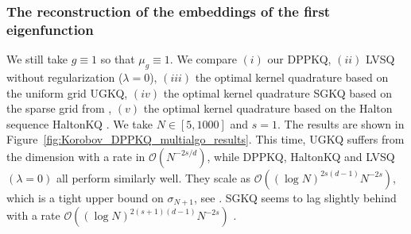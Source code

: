 \documentclass[twoside,11pt]{book}
\numberwithin{theorem}{chapter}
\numberwithin{definition}{chapter}
\numberwithin{proposition}{chapter}
\numberwithin{corollary}{chapter}
\numberwithin{example}{chapter}
\numberwithin{lemma}{chapter}
\numberwithin{assumption}{chapter}
\begin{document}
\subsubsection{The reconstruction of the embeddings of the first eigenfunction}
We still take $g\equiv 1$ so that $\mu_{g} \equiv 1$. We compare $(i)$ our DPPKQ, $(ii)$ LVSQ without regularization ($\lambda =0$), $(iii)$ the optimal kernel quadrature based on the uniform grid UGKQ, $(iv)$ the optimal kernel quadrature SGKQ based on the sparse grid from \citep{Smo63}, $(v)$ the optimal kernel quadrature based on the Halton sequence HaltonKQ \citep{Hal64}. We take $N \in [5,1000]$ and $s =1$. The results are shown in Figure~\ref{fig:Korobov_DPPKQ_multialgo_results}. This time, UGKQ suffers from the dimension with a rate in $\mathcal{O}(N^{-2s/d})$, while DPPKQ, HaltonKQ and LVSQ $(\lambda = 0)$ all perform similarly well. They scale as $\mathcal{O}((\log N)^{2s(d-1)} N^{-2s})$, which is a tight upper bound on $\sigma_{N+1}$, see \citep{Bac17}.
 SGKQ seems to lag slightly behind with a rate $\mathcal{O}((\log N)^{2(s+1)(d-1)} N^{-2s})$ 
 \citep{Hol08,Smo63}.
\end{document}
